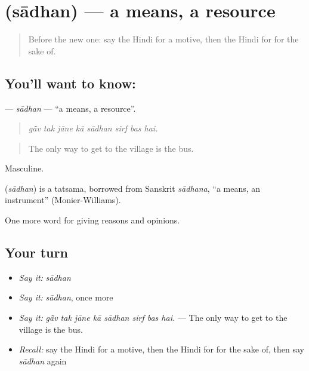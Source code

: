 \section[\texorpdfstring{\hi{साधन} (sādhan)}{साधन (sādhan)}]{ (sādhan) — a means, a resource}

\label{lesson:HI-C345-sadhan}



\begin{quote}
Before the new one: say the Hindi for a motive, then the Hindi for for the sake of.
\end{quote}

\subsection*{You'll want to know: }
\textbf{} — \emph{sādhan} — \textquotedblleft{}a means, a resource\textquotedblright{}.

\begin{quote}
       
\end{quote}

\begin{quote}
\emph{gā̃v tak jāne kā sādhan sirf bas hai.}
\end{quote}

\begin{quote}
The only way to get to the village is the bus.
\end{quote}

Masculine.

\begin{cousinweb}
\textbf{} (\emph{sādhan}) is a tatsama, borrowed from Sanskrit \emph{sādhana}, \textquotedblleft{}a means, an instrument\textquotedblright{} (Monier-Williams).
\end{cousinweb}

\begin{grammarlens}[title={What you've built}]
One more word for giving reasons and opinions.
\end{grammarlens}

\subsection*{Your turn}
\begin{itemize}
\raggedright
  \item \emph{Say it:} \emph{sādhan}
  \item \emph{Say it:} \emph{sādhan}, once more
  \item \emph{Say it:} \emph{gā̃v tak jāne kā sādhan sirf bas hai.} — The only way to get to the village is the bus.
  \item \emph{Recall:} say the Hindi for a motive, then the Hindi for for the sake of, then say \emph{sādhan} again
\end{itemize}


